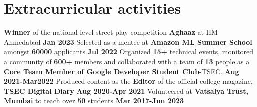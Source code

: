 \documentclass[10pt]{article}
\newcommand{\hskills}[1]{
\textbf{\bfseries #1} }
\begin{document}
\section{\textbf{Extracurricular activities }}
\vspace{2pt}
\textbf{Winner} of the national level street play competition \textbf{Aghaaz} at IIM-Ahmedabad \hfill \textbf{Jan 2023}
\newline 
Selected as a mentee at \textbf{Amazon ML Summer School} amongst \textbf{60000} applicants \hfill \textbf{Jul 2022}
\newline
Organized \textbf{15+} technical events, monitored a community of \textbf{600+} members and collaborated \newline with a team of \textbf{13} people as a  \textbf{Core Team Member of Google Developer Student Club}-TSEC. \hfill \textbf{Aug 2021-Mar2022}
\newline
Produced content as the \textbf{Editor} of the official college magazine, \textbf{TSEC Digital Diary} \hfill \textbf{Aug 2020-Apr 2021}
\newline
Volunteered at \textbf{Vatsalya Trust, Mumbai} to teach over \textbf{50} students \hfill \textbf{Mar 2017-Jun 2023}









\end{document}
